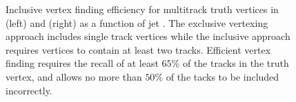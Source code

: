 \begin{figure}[!htbp]
\begin{subfigure}[b]{0.48\textwidth}
    \end{subfigure}
    \caption{
        Inclusive vertex finding efficiency for multitrack truth vertices in \ttbarbjets (left) and \Zprimejets (right) as a function of jet \pt.
        The exclusive vertexing approach includes single track vertices while the inclusive approach requires vertices to contain at least two tracks.
        Efficient vertex finding requires the recall of at least $65\%$ of the tracks in the truth vertex, and allows no more than $50\%$ of the tacks to be included incorrectly.
        }
    \label{fig:zprime_vert_eff}
\end{figure}


%
%
